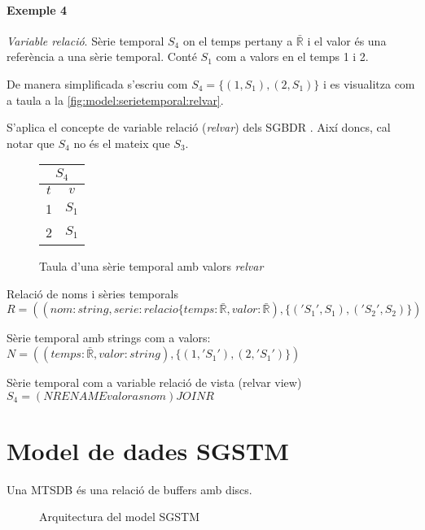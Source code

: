 \paragraph{Exemple 4} \emph{Variable relació}.
Sèrie temporal $S_4$ on el temps pertany a $\bar{\mathbb{R}}$ i el valor és una referència a una sèrie temporal. Conté $S_1$ com a valors en el temps 1 i 2. 

De manera simplificada s'escriu com
$S_4 =  \{ (1,S_1) , (2,S_1) \}$ 
i es visualitza com a taula a la \autoref{fig:model:serietemporal:relvar}.

S'aplica el concepte de variable relació (\emph{relvar}) dels SGBDR \parencite[sec.\ 3.3]{date}.
Així doncs, cal notar que $S_4$  no és el mateix que $S_3$.
\begin{figure}[tp]
  \centering
  \begin{tabular}{|c|c|}
    \multicolumn{2}{c}{$S_4$} \\ \hline
    $t$  & $v$ \\ \hline
    1 & $S_1$ \\
    2 & $S_1$ \\ \hline
  \end{tabular}
  \caption{Taula d'una sèrie temporal amb valors \emph{relvar}}
  \label{fig:model:serietemporal:relvar}
\end{figure}


Relació de noms i sèries temporals $R =  ((nom:string,serie:relacio\{temps:\bar{\mathbb{R}},valor:\bar{\mathbb{R}}),\{ ('S_1',S_1),('S_2',S_2)  \})$

Sèrie temporal amb strings com a valors:
$N= ( (temps:\bar{\mathbb{R}},valor:string) ,\{ (1,'S_1') , (2,'S_1') \})$

Sèrie temporal com a variable relació de vista (relvar view)
$S_4 =  (N RENAME valor as nom) JOIN R$


\section{Model de dades SGSTM}

Una MTSDB és una relació de buffers amb discs. 


\begin{figure}[tp]
\centering

\caption{Arquitectura del model SGSTM}
\label{fig:model:bdstm}
\end{figure}


